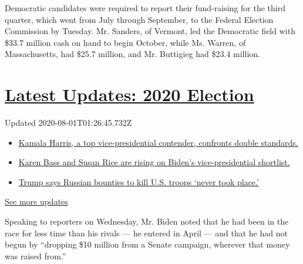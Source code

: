 Democratic candidates were required to report their fund-raising for the
third quarter, which went from July through September, to the Federal
Election Commission by Tuesday. Mr. Sanders, of Vermont, led the
Democratic field with \$33.7 million cash on hand to begin October,
while Ms. Warren, of Massachusetts, had \$25.7 million, and Mr.
Buttigieg had \$23.4 million.

\hypertarget{latest-updates-2020-election}{%
\section{\texorpdfstring{\href{https://www.nytimes.com/2020/07/31/us/elections/biden-vs-trump.html?action=click\&pgtype=Article\&state=default\&region=MAIN_CONTENT_1\&context=storylines_live_updates}{Latest
Updates: 2020
Election}}{Latest Updates: 2020 Election}}\label{latest-updates-2020-election}}

Updated 2020-08-01T01:26:45.732Z

\begin{itemize}
\tightlist
\item
  \href{https://www.nytimes.com/2020/07/31/us/elections/biden-vs-trump.html?action=click\&pgtype=Article\&state=default\&region=MAIN_CONTENT_1\&context=storylines_live_updates\#link-29fdff45}{Kamala
  Harris, a top vice-presidential contender, confronts double
  standards.}
\item
  \href{https://www.nytimes.com/2020/07/31/us/elections/biden-vs-trump.html?action=click\&pgtype=Article\&state=default\&region=MAIN_CONTENT_1\&context=storylines_live_updates\#link-13ec3d9c}{Karen
  Bass and Susan Rice are rising on Biden's vice-presidential
  shortlist.}
\item
  \href{https://www.nytimes.com/2020/07/31/us/elections/biden-vs-trump.html?action=click\&pgtype=Article\&state=default\&region=MAIN_CONTENT_1\&context=storylines_live_updates\#link-49e9a016}{Trump
  says Russian bounties to kill U.S. troops `never took place.'}
\end{itemize}

\href{https://www.nytimes.com/2020/07/31/us/elections/biden-vs-trump.html?action=click\&pgtype=Article\&state=default\&region=MAIN_CONTENT_1\&context=storylines_live_updates}{See
more updates}

Speaking to reporters on Wednesday, Mr. Biden noted that he had been in
the race for less time than his rivals --- he entered in April --- and
that he had not begun by ``dropping \$10 million from a Senate campaign,
wherever that money was raised from.''

